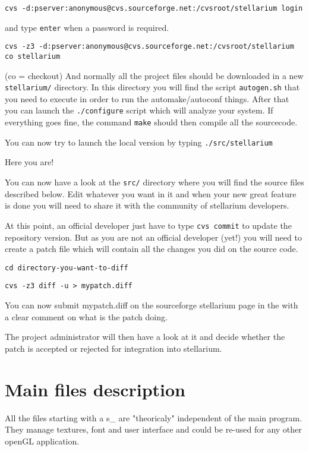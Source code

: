 \documentclass[11pt,oneside] {article}
\begin{document}
{\tt cvs -d:pserver:anonymous@cvs.sourceforge.net:/cvsroot/stellarium login}

and type {\tt enter} when a password is required.

{\tt cvs -z3 -d:pserver:anonymous@cvs.sourceforge.net:/cvsroot/stellarium co stellarium}

(co = checkout)
And normally all the project files should be downloaded in a new {\tt stellarium/} directory.
In this directory you will find the script {\tt autogen.sh} that you need to execute in
order to run the automake/autoconf things.
After that you can launch the {\tt ./configure} script which will analyze your system.
If everything goes fine, the command {\tt make} should then compile all the sourcecode.

You can now try to launch the local version by typing {\tt ./src/stellarium}

Here you are!

You can now have a look at the {\tt src/} directory where you will find the source files described below.
Edit whatever you want in it and when your new great feature is done you will need to share it with the community of stellarium developers.

At this point, an official developer just have to type {\tt cvs commit} to update the repository version. But as you are not an official developer (yet!) you will need to create a patch file which will contain all the changes you did on the source code.

{\tt cd directory-you-want-to-diff}

{\tt cvs -z3 diff -u > mypatch.diff}

You can now submit mypatch.diff on the sourceforge stellarium page in the  with a clear comment on what is the patch doing.

The project administrator will then have a look at it and decide whether the patch is accepted or rejected for integration into stellarium.

\section{Main files description}
All the files starting with a s\_ are "theoricaly" independent of the main program. They manage textures, font and user interface and could be re-used for any other openGL application.
\end{document}
